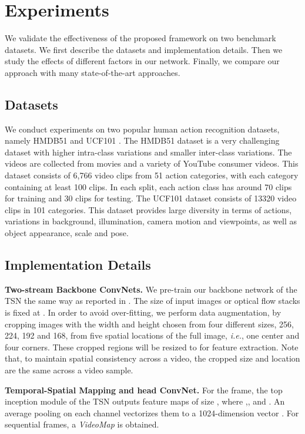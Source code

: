 \documentclass[english, 10pt, twocolumn, twoside]{IEEEtran}
\begin{document}
\section{Experiments}
\label{secExperiments}
We validate the effectiveness of the proposed framework on two benchmark datasets. We first describe the datasets and implementation details. Then we study the effects of different factors in our network. Finally, we compare our approach with many state-of-the-art approaches. 

\subsection{Datasets}


We conduct experiments on two popular human action recognition datasets, namely HMDB51 \cite{kuehne2011hmdb} and UCF101 \cite{soomro2012ucf101}. The HMDB51 dataset is a very challenging dataset with higher intra-class variations and smaller inter-class variations. The videos are collected from movies and a variety of YouTube consumer videos. This dataset consists of 6,766 video clips from 51 action categories, with each category containing at least 100 clips. In each split, each action class has around 70 clips for training and 30 clips for testing. The UCF101 dataset consists of 13320 video clips in 101 categories. This dataset provides large diversity in terms of actions, variations in background, illumination, camera motion and viewpoints, as well as object appearance, scale and pose.


\subsection{Implementation Details}
\noindent\textbf{Two-stream Backbone ConvNets.}
We pre-train our backbone network of the TSN the same way as reported in \cite{wang2016temporal}. The size of input images or optical flow stacks is fixed at . In order to avoid over-fitting, we perform data augmentation, by cropping images with the width and height chosen from four different sizes, 256, 224, 192 and 168, from five spatial locations of the full image, \emph{i.e.}, one center and four corners. These cropped regions will be resized to  for feature extraction. Note that, to maintain spatial consistency across a video, the cropped size and location are the same across a video sample.





\noindent\textbf{Temporal-Spatial Mapping and head ConvNet.} For the  frame, the top inception module of the TSN outputs feature maps  of size , where ,, and . An average pooling on each channel vectorizes them to a 1024-dimension vector . For  sequential frames, a \emph{VideoMap}  is obtained.
\end{document}
